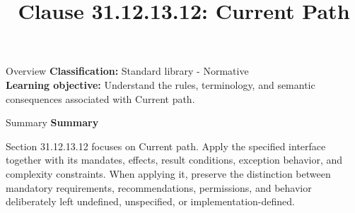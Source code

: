 \documentclass[10pt,letterpaper]{article}
\title{Clause 31.12.13.12: Current Path}
\author{}
\date{}
\begin{document}
\maketitle
\begin{CornellOverviewBox}{Overview}
\textbf{Classification:} Standard library - Normative\\[2pt]
\textbf{Learning objective:} Understand the rules, terminology, and semantic consequences associated with Current path.
\end{CornellOverviewBox}\begin{CornellSummaryBox}{Summary}
{\sffamily\bfseries\color{Accent} Summary}\par\vspace{3pt}Section 31.12.13.12 focuses on Current path. Apply the specified interface together with its mandates, effects, result conditions, exception behavior, and complexity constraints. When applying it, preserve the distinction between mandatory requirements, recommendations, permissions, and behavior deliberately left undefined, unspecified, or implementation-defined.
\end{CornellSummaryBox}
\end{document}
